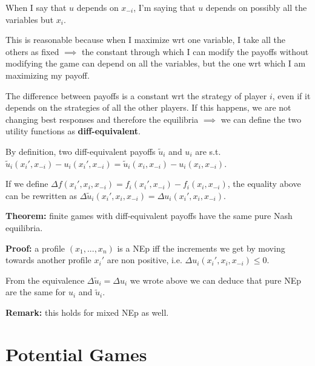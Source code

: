 
%


\bigskip
\noindent When I say that $u$ depends on $x_{-i}$, I'm saying that $u$ 
depends on possibly all the variables but $x_i$.

\noindent This is reasonable because when I maximize wrt one variable, I 
take all the others as fixed $\implies$ the constant through which I can modify 
the payoffs without modifying the game can depend on all the variables, but 
the one wrt which I am maximizing my payoff.

\noindent The difference between payoffs is a constant wrt the strategy 
of player $i$, even if it depends on the strategies of all the other 
players. If this happens, we are not changing best responses and therefore 
the equilibria $\implies$ we can define the two utility functions as 
\textbf{diff-equivalent}.

\bigskip
\noindent By definition, two diff-equivalent payoffs $\tilde{u}_i$ and $u_i$ are s.t. $\tilde{u}_i(x_i',x_{-i}) - u_i(x_i',x_{-i}) = 
\tilde{u}_i(x_i,x_{-i}) - u_i(x_i,x_{-i})$.

\noindent If we define $\Delta f(x_i',x_i,x_{-i}) = f_i(x_i',x_{-i}) - f_i(x_i,x_{-i})$, the equality above can be rewritten as 
$\Delta \tilde{u}_i(x_i',x_i,x_{-i}) = \Delta u_i(x_i',x_i,x_{-i})$.

\bigskip
\noindent \textbf{Theorem:} finite games with diff-equivalent payoffs have the same pure Nash equilibria.

\bigskip
\noindent \textbf{Proof:} a profile $(x_1,...,x_n)$ is a NEp iff the increments we get by moving towards another profile $x_i'$ are non 
positive, i.e. $\Delta u_i(x_i',x_i,x_{-i}) \leq 0$.

\noindent From the equivalence $\Delta \tilde{u}_i = \Delta u_i$ we wrote above we can deduce that pure NEp are the same for $u_i$ and $\tilde{u}_i$.

\bigskip
\noindent \textbf{Remark:} this holds for mixed NEp as well.

\section{Potential Games}

